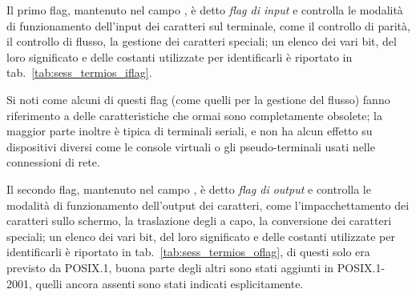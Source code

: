 Il primo flag, mantenuto nel campo , è detto \textsl{flag di
  input} e controlla le modalità di funzionamento dell'input dei caratteri sul
terminale, come il controllo di parità, il controllo di flusso, la gestione
dei caratteri speciali; un elenco dei vari bit, del loro significato e delle
costanti utilizzate per identificarli è riportato in
tab.~\ref{tab:sess_termios_iflag}.

Si noti come alcuni di questi flag (come quelli per la gestione del flusso)
fanno riferimento a delle caratteristiche che ormai sono completamente
obsolete; la maggior parte inoltre è tipica di terminali seriali, e non ha
alcun effetto su dispositivi diversi come le console virtuali o gli
pseudo-terminali usati nelle connessioni di rete.

Il secondo flag, mantenuto nel campo , è detto \textsl{flag di
  output} e controlla le modalità di funzionamento dell'output dei caratteri,
come l'impacchettamento dei caratteri sullo schermo, la traslazione degli a
capo, la conversione dei caratteri speciali; un elenco dei vari bit, del loro
significato e delle costanti utilizzate per identificarli è riportato in
tab.~\ref{tab:sess_termios_oflag}, di questi solo  era previsto
da POSIX.1, buona parte degli altri sono stati aggiunti in POSIX.1-2001,
quelli ancora assenti sono stati indicati esplicitamente.


